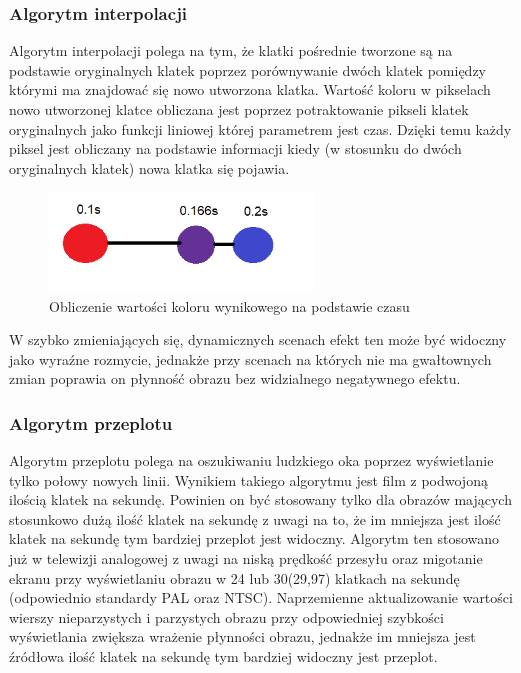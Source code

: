 \documentclass[twoside]{projektInzynierskiMS}
\begin{document}
\subsubsection{Algorytm interpolacji}
Algorytm interpolacji polega na tym, że klatki pośrednie tworzone są na podstawie oryginalnych klatek poprzez porównywanie dwóch klatek pomiędzy którymi ma znajdować się nowo utworzona klatka. Wartość koloru w pikselach nowo utworzonej klatce obliczana jest poprzez potraktowanie pikseli klatek oryginalnych jako funkcji liniowej której parametrem jest czas. Dzięki temu każdy piksel jest obliczany na podstawie informacji kiedy (w stosunku do dwóch oryginalnych klatek) nowa klatka się pojawia.

\begin{figure}[h]
\centering
\includegraphics[width=7cm]{FpsInterpolation.png}
\caption{Obliczenie wartości koloru wynikowego na podstawie czasu}
\end{figure}

W szybko zmieniających się, dynamicznych scenach efekt ten może być widoczny jako wyraźne rozmycie, jednakże przy scenach na których nie ma gwałtownych zmian poprawia on płynność obrazu bez widzialnego negatywnego efektu.

\subsubsection{Algorytm przeplotu}
Algorytm przeplotu polega na oszukiwaniu ludzkiego oka poprzez wyświetlanie tylko połowy nowych linii. Wynikiem takiego algorytmu jest film z podwojoną ilością klatek na sekundę. Powinien on być stosowany tylko dla obrazów mających stosunkowo dużą ilość klatek na sekundę z uwagi na to, że im mniejsza jest ilość klatek na sekundę tym bardziej przeplot jest widoczny. Algorytm ten stosowano już w telewizji analogowej z uwagi na niską prędkość przesyłu oraz migotanie ekranu przy wyświetlaniu obrazu w 24 lub 30(29,97) klatkach na sekundę (odpowiednio standardy PAL oraz NTSC). Naprzemienne aktualizowanie wartości wierszy nieparzystych i parzystych obrazu przy odpowiedniej szybkości wyświetlania zwiększa wrażenie płynności obrazu, jednakże im mniejsza jest źródłowa ilość klatek na sekundę tym bardziej widoczny jest przeplot.
\end{document}
